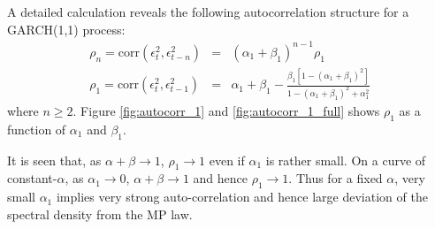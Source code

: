 \documentclass{article}
\begin{document}
A detailed calculation reveals the following autocorrelation
structure for a GARCH(1,1) process:
\begin{eqnarray*}
  \rho_n = \text{corr}(\epsilon_t^2, \epsilon_{t-n}^2) &=& (\alpha_1
  + \beta_1)^{n-1} \rho_1 \\
  \rho_1 = \text{corr}(\epsilon_t^2, \epsilon_{t-1}^2) &=& \alpha_1 +
  \beta_1 - \frac{\beta_1 [1 - (\alpha_1 + \beta_1)^2]}{
    1 - (\alpha_1 + \beta_1)^2 + \alpha_1^2
  }
\end{eqnarray*}
where $n \geq 2$. Figure \ref{fig:autocorr_1} and
\ref{fig:autocorr_1_full} shows $\rho_1$ as a function of $\alpha_1$
and $\beta_1$.
\begin{figure}[htb!]
  \centering
\end{figure}
It is seen that, as $\alpha + \beta \to 1$, $\rho_1 \to 1$ even if
$\alpha_1$ is rather small. On a curve of constant-$\alpha$, as
$\alpha_1 \to 0$, $\alpha + \beta \to 1$ and hence $\rho_1 \to
1$. Thus for a fixed $\alpha$, very small $\alpha_1$ implies very
strong auto-correlation and hence large deviation of the spectral
density from the MP law.
\end{document}
